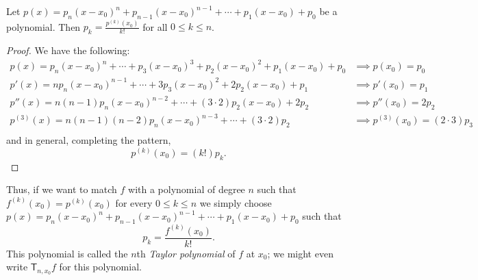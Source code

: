 \begin{lemma}
  Let $ p(x) = p_n (x - x_0)^n + p_{n - 1} (x - x_0)^{n -1} + \cdots + p_1 (x - x_0) + p_0 $ be a polynomial. Then $ p_k = \frac{p^{(k)}(x_0)}{k!} $
  for all $ 0 \leq k \leq n $.
\end{lemma}
\begin{proof}
  We have the following:
  \begin{align*}
    p(x) = p_n (x - x_0)^n + \cdots + p_3 (x - x_0)^3 + p_2 (x - x_0)^2 + p_1 (x - x_0) + p_0 &\implies p(x_0) = p_0\\
    p'(x) = n p_n (x - x_0)^{n-1} + \cdots + 3p_3 (x - x_0)^2 + 2p_2 (x - x_0) + p_1 &\implies p'(x_0) = p_1\\
    p''(x) = n(n - 1) p_n (x - x_0)^{n - 2} + \cdots + (3 \cdot 2)p_2 (x - x_0) + 2p_2 & \implies p''(x_0) = 2p_2\\
    p^{(3)}(x) = n(n - 1)(n - 2) p_n (x - x_0)^{n - 3} + \cdots + (3 \cdot 2)p_2 & \implies p^{(3)}(x_0) = (2 \cdot 3)p_3\\
  \end{align*}
  and in general, completing the pattern,
  \begin{displaymath}
    p^{(k)}(x_0) = (k!)p_k.
  \end{displaymath}
\end{proof}

Thus, if we want to match $ f $ with a polynomial of degree $ n $ such that $ f^{(k)}(x_0) = p^{(k)}(x_0) $
for every $ 0 \leq k \leq n $ we simply choose $ p(x) = p_n (x - x_0)^n + p_{n - 1} (x - x_0)^{n -1} + \cdots + p_1 (x - x_0) + p_0 $
such that
\begin{displaymath}
  p_k = \frac{f^{(k)}(x_0)}{k!}.
\end{displaymath}
This polynomial is called the $ n$th \emph{Taylor polynomial} of $ f $ at $ x_0 $; we might even write $ \mathsf{T}_{n, x_0} f $
for this polynomial.

